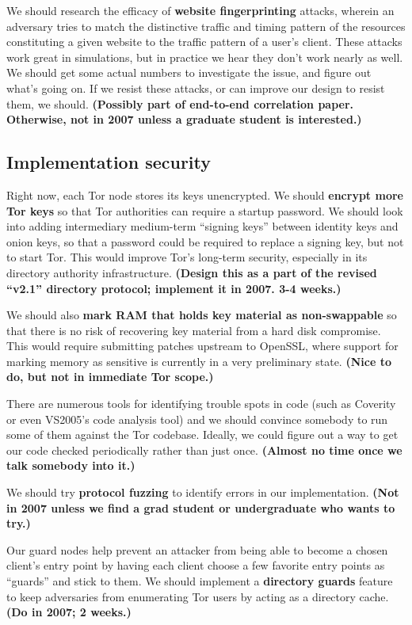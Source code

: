 \documentclass{article}
\newcommand{\plan}[1]{ {\bf (#1)}}
\begin{document}
We should research the efficacy of {\bf website fingerprinting} attacks,
wherein an adversary tries to match the distinctive traffic and timing
pattern of the resources constituting a given website to the traffic pattern
of a user's client.  These attacks work great in simulations, but in
practice we hear they don't work nearly as well.  We should get some actual
numbers to investigate the issue, and figure out what's going on.  If we
resist these attacks, or can improve our design to resist them, we should.
\plan{Possibly part of end-to-end correlation paper.  Otherwise, not in 2007
  unless a graduate student is interested.}

\subsection{Implementation security}
Right now, each Tor node stores its keys unencrypted.  We should {\bf encrypt
  more Tor keys} so that Tor authorities can require a startup password.  We
should look into adding intermediary medium-term ``signing keys'' between
identity keys and onion keys, so that a password could be required to replace
a signing key, but not to start Tor.  This would improve Tor's long-term
security, especially in its directory authority infrastructure.\plan{Design this
  as a part of the revised ``v2.1'' directory protocol; implement it in
  2007. 3-4 weeks.}

We should also {\bf mark RAM that holds key material as non-swappable} so
that there is no risk of recovering key material from a hard disk
compromise.  This would require submitting patches upstream to OpenSSL, where
support for marking memory as sensitive is currently in a very preliminary
state.\plan{Nice to do, but not in immediate Tor scope.}

There are numerous tools for identifying trouble spots in code (such as
Coverity or even VS2005's code analysis tool) and we should convince somebody
to run some of them against the Tor codebase.  Ideally, we could figure out a
way to get our code checked periodically rather than just once.\plan{Almost
  no time once we talk somebody into it.}

We should try {\bf protocol fuzzing} to identify errors in our
implementation.\plan{Not in 2007 unless we find a grad student or
  undergraduate who wants to try.}

Our guard nodes help prevent an attacker from being able to become a chosen
client's entry point by having each client choose a few favorite entry points
as ``guards'' and stick to them.   We should implement a {\bf directory
  guards} feature to keep adversaries from enumerating Tor users by acting as
a directory cache.\plan{Do in 2007; 2 weeks.}
\end{document}
